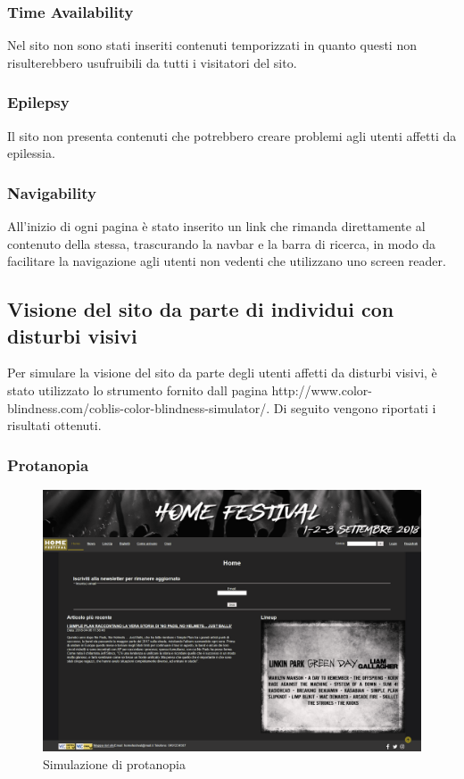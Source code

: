 \documentclass[10pt, a4paper]{article}
\begin{document}
\subsubsection{Time Availability}
Nel sito non sono stati inseriti contenuti temporizzati in quanto questi non risulterebbero usufruibili da tutti i visitatori del sito.

\subsubsection{Epilepsy}
Il sito non presenta contenuti che potrebbero creare problemi agli utenti affetti da epilessia.

\subsubsection{Navigability}
All'inizio di ogni pagina è stato inserito un link che rimanda direttamente al contenuto della stessa, trascurando la navbar e la barra di ricerca, in modo da facilitare la navigazione agli utenti non vedenti che utilizzano uno screen reader.

\subsection{Visione del sito da parte di individui con disturbi visivi}

Per simulare la visione del sito da parte degli utenti affetti da disturbi visivi, è stato utilizzato lo strumento fornito dall pagina http://www.color-blindness.com/coblis-color-blindness-simulator/. Di seguito vengono riportati i risultati ottenuti.

\subsubsection{Protanopia}

\begin{figure}[h!]
 \centering
  \includegraphics[width=1\textwidth]{Images/protanopia.png}
  \caption{Simulazione di protanopia}
  \label{fig:protanopia}
\end{figure}
\newpage
\end{document}
